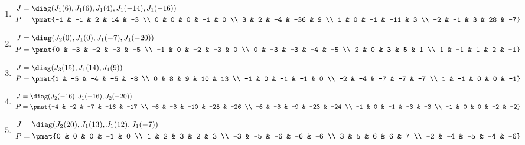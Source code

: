 \begin{enumerate}
\item

\begin{align*}
J &= \diag(J_{1}(6), J_{1}(6), J_{1}(4), J_{1}(-14), J_{1}(-16))\\
P &= \pmat{-1 & -1 & 2 & 14 & -3 \\ 0 & 0 & 0 & -1 & 0 \\ 3 & 2 & -4 & -36 & 9 \\ 1 & 0 & -1 & -11 & 3 \\ -2 & -1 & 3 & 28 & -7}
\end{align*}

\item

\begin{align*}
J &= \diag(J_{2}(0), J_{1}(0), J_{1}(-7), J_{1}(-20))\\
P &= \pmat{0 & -3 & -2 & -3 & -5 \\ -1 & 0 & -2 & -3 & 0 \\ 0 & -3 & -3 & -4 & -5 \\ 2 & 0 & 3 & 5 & 1 \\ 1 & -1 & 1 & 2 & -1}
\end{align*}

\item

\begin{align*}
J &= \diag(J_{3}(15), J_{1}(14), J_{1}(9))\\
P &= \pmat{1 & -5 & -4 & -5 & -8 \\ 0 & 8 & 9 & 10 & 13 \\ -1 & 0 & -1 & -1 & 0 \\ -2 & -4 & -7 & -7 & -7 \\ 1 & -1 & 0 & 0 & -1}
\end{align*}

\item

\begin{align*}
J &= \diag(J_{2}(-16), J_{1}(-16), J_{2}(-20))\\
P &= \pmat{-4 & -2 & -7 & -16 & -17 \\ -6 & -3 & -10 & -25 & -26 \\ -6 & -3 & -9 & -23 & -24 \\ -1 & 0 & -1 & -3 & -3 \\ -1 & 0 & 0 & -2 & -2}
\end{align*}

\item

\begin{align*}
J &= \diag(J_{2}(20), J_{1}(13), J_{1}(12), J_{1}(-7))\\
P &= \pmat{0 & 0 & 0 & -1 & 0 \\ 1 & 2 & 3 & 2 & 3 \\ -3 & -5 & -6 & -6 & -6 \\ 3 & 5 & 6 & 6 & 7 \\ -2 & -4 & -5 & -4 & -6}
\end{align*}


\end{enumerate}

